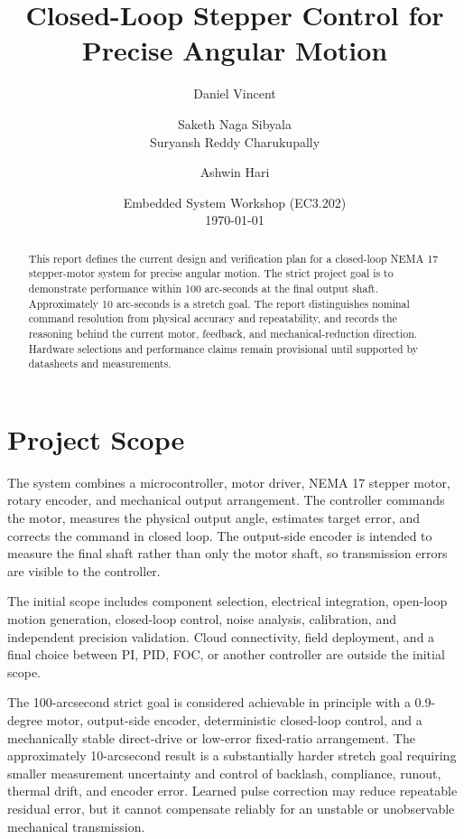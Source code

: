\documentclass[11pt,a4paper]{article}
\title{Closed-Loop Stepper Control for Precise Angular Motion}
\author{Daniel Vincent \and Saketh Naga Sibyala \\ Suryansh Reddy Charukupally \and Ashwin Hari}
\date{Embedded System Workshop (EC3.202)\\\today}
\begin{document}
\maketitle

\begin{abstract}
This report defines the current design and verification plan for a closed-loop NEMA 17 stepper-motor system for precise angular motion. The strict project goal is to demonstrate performance within 100 arc-seconds at the final output shaft. Approximately 10 arc-seconds is a stretch goal. The report distinguishes nominal command resolution from physical accuracy and repeatability, and records the reasoning behind the current motor, feedback, and mechanical-reduction direction. Hardware selections and performance claims remain provisional until supported by datasheets and measurements.
\end{abstract}

\tableofcontents

\section{Project Scope}

The system combines a microcontroller, motor driver, NEMA 17 stepper motor, rotary encoder, and mechanical output arrangement. The controller commands the motor, measures the physical output angle, estimates target error, and corrects the command in closed loop. The output-side encoder is intended to measure the final shaft rather than only the motor shaft, so transmission errors are visible to the controller.

The initial scope includes component selection, electrical integration, open-loop motion generation, closed-loop control, noise analysis, calibration, and independent precision validation. Cloud connectivity, field deployment, and a final choice between PI, PID, FOC, or another controller are outside the initial scope.

The 100-arcsecond strict goal is considered achievable in principle with a 0.9-degree motor, output-side encoder, deterministic closed-loop control, and a mechanically stable direct-drive or low-error fixed-ratio arrangement. The approximately 10-arcsecond result is a substantially harder stretch goal requiring smaller measurement uncertainty and control of backlash, compliance, runout, thermal drift, and encoder error. Learned pulse correction may reduce repeatable residual error, but it cannot compensate reliably for an unstable or unobservable mechanical transmission.
\end{document}
